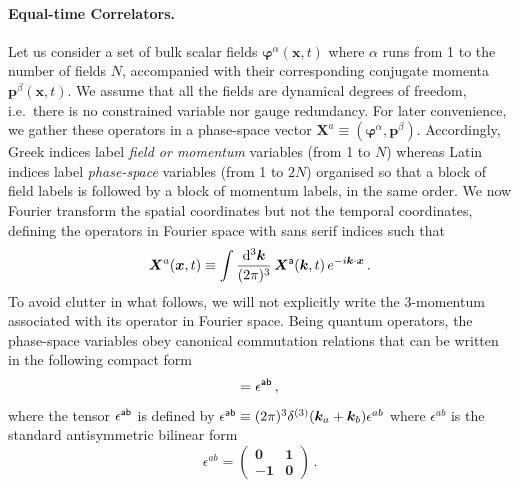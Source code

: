 \documentclass[11pt]{article}
\numberwithin{equation}{section} %
\def \d {\mathrm{d}}
\begin{document}
\paragraph{Equal-time Correlators.} Let us consider a set of bulk scalar fields $\bm{\varphi}^\alpha(\bm{x}, t)$ where $\alpha$ runs from 1 to the number of fields $N$, accompanied with their corresponding conjugate momenta $\bm{p}^\beta(\bm{x}, t)$. We assume that all the fields are dynamical degrees of freedom, i.e.~there is no constrained variable nor gauge redundancy. For later convenience, we gather these operators in a phase-space vector $\bm{X}^a \equiv (\bm{\varphi}^\alpha, \bm{p}^\beta)$. Accordingly, Greek indices label \textit{field or momentum} variables (from 1 to $N$) whereas Latin indices label \textit{phase-space} variables (from 1 to $2N$) organised so that a block of field labels is followed by a block of momentum labels, in the same order. We now Fourier transform the spatial coordinates but not the temporal coordinates, defining the operators in Fourier space with \textsf{sans serif} indices such that
\begin{equation}
\bm{X}^a(\bm{x}, t) \equiv \int \frac{\d^3\bm{k}}{(2\pi)^3}\, \bm{X}^{\sf{a}}(\bm{k}, t) \, e^{-i\bm{k}\cdot\bm{x}}\,.
\end{equation}
To avoid clutter in what follows, we will not explicitly write the 3-momentum associated with its operator in Fourier space. Being quantum operators, the phase-space variables obey canonical commutation relations that can be written in the following compact form
\begin{equation}
    [\bm{X}^{\sf{a}}, \bm{X}^{\sf{b}}] = \epsilon^{\sf{ab}}\,,
\end{equation}
where the tensor $\epsilon^{\sf{ab}}$ is defined by $\epsilon^{\sf{ab}} \equiv (2\pi)^3 \delta^{(3)}(\bm{k}_a + \bm{k}_b) \epsilon^{ab}$ where $\epsilon^{ab}$ is the standard antisymmetric bilinear form
\begin{equation}
    \epsilon^{ab} = 
    \begin{pmatrix}
    \bm{0}  & \bm{1} \\
    \bm{-1} & \bm{0}
    \end{pmatrix}\,.
\end{equation}
\end{document}
